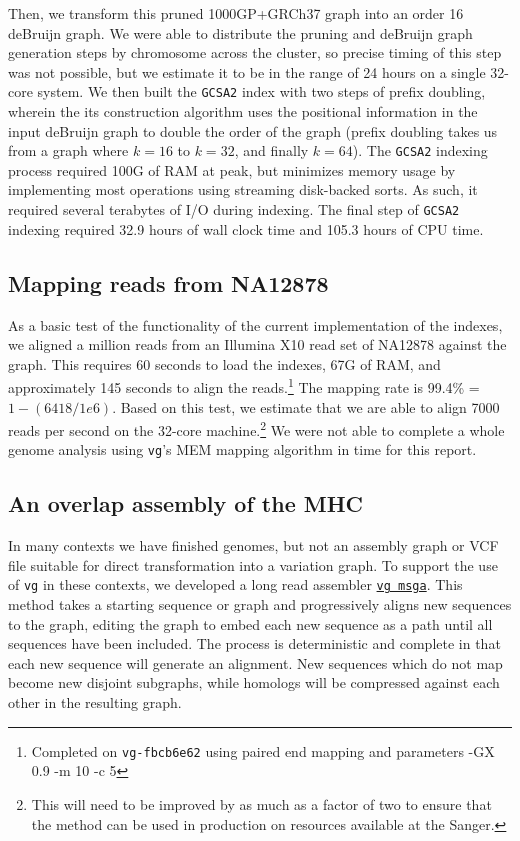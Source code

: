 \documentclass[12pt]{article}
\begin{document}
Then, we transform this pruned 1000GP+GRCh37 graph into an order 16 deBruijn graph.
We were able to distribute the pruning and deBruijn graph generation steps by chromosome across the cluster, so precise timing of this step was not possible, but we estimate it to be in the range of 24 hours on a single 32-core system.
We then built the {\tt GCSA2} index with two steps of prefix doubling, wherein the its construction algorithm uses the positional information in the input deBruijn graph to double the order of the graph (prefix doubling takes us from a graph where $k = 16$ to $k = 32$, and finally $k = 64$).
The {\tt GCSA2} indexing process required 100G of RAM at peak, but minimizes memory usage by implementing most operations using streaming disk-backed sorts.
As such, it required several terabytes of I/O during indexing.
The final step of {\tt GCSA2} indexing required 32.9 hours of wall clock time and 105.3 hours of CPU time.

\subsection{Mapping reads from NA12878}

As a basic test of the functionality of the current implementation of the indexes, we aligned a million reads from an Illumina X10 read set of NA12878 against the graph.
This requires 60 seconds to load the indexes, 67G of RAM, and approximately 145 seconds to align the reads.\footnote{Completed on {\tt vg-fbcb6e62} using paired end mapping and parameters -GX 0.9 -m 10 -c 5}
The mapping rate is 99.4\% = $1 - (6418 / 1e6)$.
Based on this test, we estimate that we are able to align 7000 reads per second on the 32-core machine.\footnote{This will need to be improved by as much as a factor of two to ensure that the method can be used in production on resources available at the Sanger.}
We were not able to complete a whole genome analysis using {\tt vg}'s MEM mapping algorithm in time for this report.

\subsection{An overlap assembly of the MHC}
\label{sec:MHC}

In many contexts we have finished genomes, but not an assembly graph or VCF file suitable for direct transformation into a variation graph. 
To support the use of {\tt vg} in these contexts,
we developed a long read assembler \href{https://github.com/vgteam/vg/wiki/Long-read-assemblies-using-vg-msga}{\tt vg msga}.
This method takes a starting sequence or graph and progressively aligns new sequences to the graph, editing the graph to embed each new sequence as a path until all sequences have been included.
The process is deterministic and complete in that each new sequence will generate an alignment.
New sequences which do not map become new disjoint subgraphs, while homologs will be compressed against each other in the resulting graph.
\end{document}
